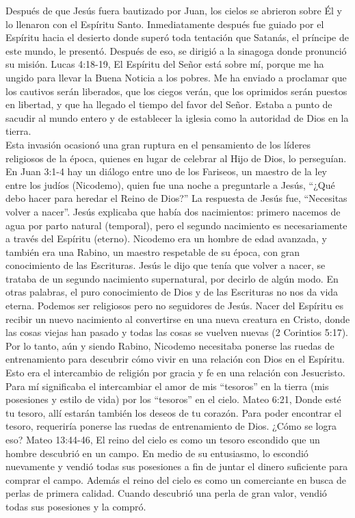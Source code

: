 \documentclass[twoside, 12pt]{book}
\begin{document}
Después de que Jesús fuera bautizado por Juan, los cielos se abrieron sobre Él y lo llenaron con el Espíritu Santo. Inmediatamente después fue guiado por el Espíritu hacia el desierto donde superó toda tentación que Satanás, el príncipe de este mundo, le presentó. Después de eso, se dirigió a la sinagoga donde pronunció su misión. Lucas 4:18-19, El Espíritu del Señor está sobre mí, porque me ha ungido para llevar la Buena Noticia a los pobres. Me ha enviado a proclamar que los cautivos serán liberados, que los ciegos verán, que los oprimidos serán puestos en libertad, y que ha llegado el tiempo del favor del Señor. Estaba a punto de sacudir al mundo entero y de establecer la iglesia como la autoridad de Dios en la tierra.\\

 Esta invasión ocasionó una gran ruptura en el pensamiento de los líderes religiosos de la época, quienes en lugar de celebrar al Hijo de Dios, lo perseguían. En Juan 3:1-4 hay un diálogo entre uno de los Fariseos, un maestro de la ley entre los judíos (Nicodemo), quien fue una noche a preguntarle a Jesús, “¿Qué debo hacer para heredar el Reino de Dios?” La respuesta de Jesús fue, “Necesitas volver a nacer”. Jesús explicaba que había dos nacimientos: primero nacemos de agua por parto natural (temporal), pero el segundo nacimiento es necesariamente a través del Espíritu (eterno). Nicodemo era un hombre de edad avanzada, y también era una Rabino, un maestro respetable de su época, con gran conocimiento de las Escrituras. Jesús le dijo que tenía que volver a nacer, se trataba de un segundo nacimiento supernatural, por decirlo de algún modo. En otras palabras, el puro conocimiento de Dios y de las Escrituras no nos da vida eterna. Podemos ser religiosos pero no seguidores de Jesús. Nacer del Espíritu es recibir un nuevo nacimiento al convertirse en una nueva creatura en Cristo, donde las cosas viejas han pasado y todas las cosas se vuelven nuevas (2 Corintios 5:17). Por lo tanto, aún y siendo Rabino, Nicodemo necesitaba ponerse las ruedas de entrenamiento para descubrir cómo vivir en una relación con Dios en el Espíritu. Esto era el intercambio de religión por gracia y fe en una relación con Jesucristo.\\
 
Para mí significaba el intercambiar el amor de mis “tesoros” en la tierra (mis posesiones y estilo de vida) por los “tesoros” en el cielo. Mateo 6:21, Donde esté tu tesoro, allí estarán también los deseos de tu corazón. Para poder encontrar el tesoro, requeriría ponerse las ruedas de entrenamiento de Dios. ¿Cómo se logra eso? Mateo 13:44-46, El reino del cielo es como un tesoro escondido que un hombre descubrió en un campo. En medio de su entusiasmo, lo escondió nuevamente y vendió todas sus posesiones a fin de juntar el dinero suficiente para comprar el campo. Además el reino del cielo es como un comerciante en busca de perlas de primera calidad. Cuando descubrió una perla de gran valor, vendió todas sus posesiones y la compró.\\
      	
\end{document}
